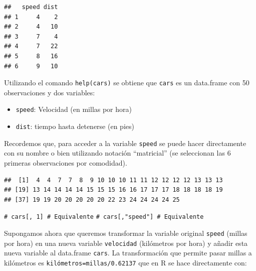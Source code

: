 \documentclass[
]{book}
\newenvironment{Shaded}{\begin{snugshade}}{\end{snugshade}}
\newcommand{\CommentTok}[1]{\textcolor[rgb]{0.56,0.35,0.01}{\textit{#1}}}
\newcommand{\DecValTok}[1]{\textcolor[rgb]{0.00,0.00,0.81}{#1}}
\newcommand{\FloatTok}[1]{\textcolor[rgb]{0.00,0.00,0.81}{#1}}
\newcommand{\NormalTok}[1]{#1}
\newcommand{\SpecialCharTok}[1]{\textcolor[rgb]{0.81,0.36,0.00}{\textbf{#1}}}
\theoremstyle{break}
\theoremstyle{nonumberplain}
\renewcommand{\CommentTok}[1]{\textcolor[rgb]{0.41,0.41,0.41}{\texttt{#1}}}
\begin{document}
\begin{verbatim}
##   speed dist
## 1     4    2
## 2     4   10
## 3     7    4
## 4     7   22
## 5     8   16
## 6     9   10
\end{verbatim}

Utilizando el comando \texttt{help(cars)} se obtiene que \texttt{cars} es un data.frame con 50
observaciones y dos variables:

\begin{itemize}
\item
  \texttt{speed}: Velocidad (en millas por hora)
\item
  \texttt{dist}: tiempo hasta detenerse (en pies)
\end{itemize}

Recordemos que, para acceder a la variable \texttt{speed} se puede
hacer directamente con su nombre o bien utilizando notación
``matricial'' (se seleccionan las 6 primeras observaciones por comodidad).

\begin{Shaded}
\end{Shaded}

\begin{verbatim}
##  [1]  4  4  7  7  8  9 10 10 10 11 11 12 12 12 12 13 13 13
## [19] 13 14 14 14 14 15 15 15 16 16 17 17 17 18 18 18 18 19
## [37] 19 19 20 20 20 20 20 22 23 24 24 24 24 25
\end{verbatim}

\begin{Shaded}
\begin{Highlighting}[]
\CommentTok{\# cars[, 1]       \# Equivalente}
\CommentTok{\# cars[,"speed"]  \# Equivalente}
\end{Highlighting}
\end{Shaded}

Supongamos ahora que queremos transformar la variable original \texttt{speed}
(millas por hora) en una nueva variable \texttt{velocidad} (kilómetros por
hora) y añadir esta nueva variable al data.frame \texttt{cars}.
La transformación que permite pasar millas a kilómetros es
\texttt{kilómetros=millas/0.62137} que en R se hace directamente con:

\begin{Shaded}
\end{Shaded}
\end{document}
